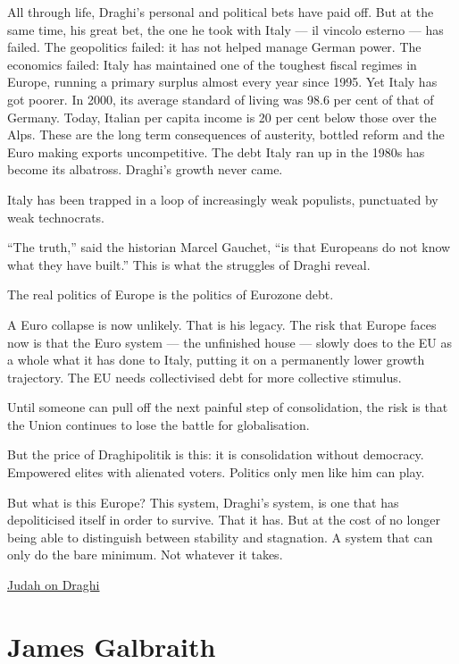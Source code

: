 \documentclass[
]{book}
\begin{document}
All through life, Draghi's personal and political bets have paid off. But at the same time, his great bet, the one he took with Italy --- il vincolo esterno --- has failed. The geopolitics failed: it has not helped manage German power. The economics failed: Italy has maintained one of the toughest fiscal regimes in Europe, running a primary surplus almost every year since 1995. Yet Italy has got poorer.
In 2000, its average standard of living was 98.6 per cent of that of Germany. Today, Italian per capita income is 20 per cent below those over the Alps. These are the long term consequences of austerity, bottled reform and the Euro making exports uncompetitive. The debt Italy ran up in the 1980s has become its albatross. Draghi's growth never came.

Italy has been trapped in a loop of increasingly weak populists, punctuated by weak technocrats.

``The truth,'' said the historian Marcel Gauchet, ``is that Europeans do not know what they have built.'' This is what the struggles of Draghi reveal.

The real politics of Europe is the politics of Eurozone debt.

A Euro collapse is now unlikely. That is his legacy. The risk that Europe faces now is that the Euro system --- the unfinished house --- slowly does to the EU as a whole what it has done to Italy, putting it on a permanently lower growth trajectory. The EU needs collectivised debt for more collective stimulus.

Until someone can pull off the next painful step of consolidation, the risk is that the Union continues to lose the battle for globalisation.

But the price of Draghipolitik is this: it is consolidation without democracy. Empowered elites with alienated voters. Politics only men like him can play.

But what is this Europe? This system, Draghi's system, is one that has depoliticised itself in order to survive. That it has. But at the cost of no longer being able to distinguish between stability and stagnation. A system that can only do the bare minimum. Not whatever it takes.

\href{https://thecritic.co.uk/issues/may-2021/the-sphinx-who-reshaped-euro\%20pe/}{Judah on Draghi}

\hypertarget{james-galbraith}{%
\section{James Galbraith}\label{james-galbraith}}
\end{document}
